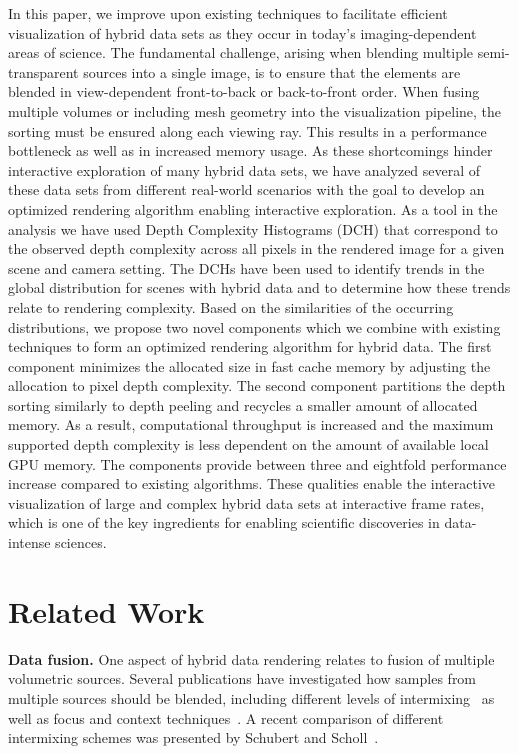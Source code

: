 \documentclass{egpubl}
\newcommand{\dch}{DCH}
\begin{document}
In this paper, we improve upon existing techniques to facilitate efficient visualization of hybrid data sets as they occur in today's imaging-dependent areas of science. 
The fundamental challenge, arising when blending multiple semi-transparent sources into a single image, is to ensure that the elements are blended in view-dependent front-to-back or back-to-front order. 
When fusing multiple volumes or including mesh geometry into the visualization pipeline, the sorting must be ensured along each viewing ray.
This results in a performance bottleneck as well as in increased memory usage. 
As these shortcomings hinder interactive exploration of many hybrid data sets, we have analyzed several of these data sets from different real-world scenarios with the goal to develop an optimized rendering algorithm enabling interactive exploration. 
As a tool in the analysis we have used {Depth Complexity Histograms} (\dch) that correspond to the observed depth complexity across all pixels in the rendered image for a given scene and camera setting. 
The \dch{}s have been used to identify trends in the global distribution for scenes with hybrid data and to determine how these trends relate to rendering complexity. 
Based on the similarities of the occurring distributions, we propose two novel components which we combine with existing techniques to form an optimized rendering algorithm for hybrid data. 
The first component minimizes the allocated size in fast cache memory by adjusting the allocation to pixel depth complexity. 
The second component partitions the depth sorting similarly to depth peeling and recycles a smaller amount of allocated memory. 
As a result, computational throughput is increased and the maximum supported depth complexity is less dependent on the amount of available local GPU memory. 
The components provide between three and eightfold performance increase compared to existing algorithms. %
These qualities enable the interactive visualization of large and complex hybrid data sets at interactive frame rates, which is one of the key ingredients for enabling scientific discoveries in data-intense sciences.







\section{Related Work}
\label{sec:related-work}

\noindent\textbf{Data fusion.} 
%
One aspect of hybrid data rendering relates to fusion of multiple volumetric sources.
Several publications have investigated how samples from multiple sources should be blended, including different levels of intermixing~\cite{cai99intermixing} as well as focus and context techniques~\cite{viola-2007-ort}. 
A recent comparison of different intermixing schemes was presented by Schubert and Scholl~\cite{Schubert2011}. 
\end{document}
